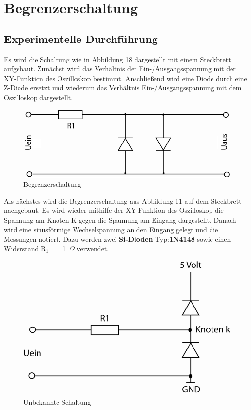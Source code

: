 \section{Begrenzerschaltung}
\subsection{Experimentelle Durchf\"uhrung}
Es wird die Schaltung wie in Abbildung 18 dargestellt mit einem Steckbrett aufgebaut. Zun\"achst wird das Verh\"altnis der Ein-/Ausgangsspannung mit der XY-Funktion des Oszilloskop bestimmt. Anschlie\ss end wird eine Diode durch eine Z-Diode ersetzt und wiederum das Verh\"altnis Ein-/Ausgangsspannung mit dem Oszilloskop dargestellt. 

\begin{figure}[ht]
\begin{center}
\includegraphics[scale=0.4]{schaltungVersuch4}
\caption{Begrenzerschaltung}
\end{center}
\end{figure} 
\noindent
Als n\"achstes wird die Begrenzerschaltung aus Abbildung 11 auf dem Steckbrett nachgebaut. Es wird wieder mithilfe der XY-Funktion des Oszilloskop die Spannung am Knoten K gegen die Spannung am Eingang dargestellt. Danach wird eine sinusf\"ormige Wechselspannung an den Eingang gelegt und die Messungen notiert. 
Dazu werden zwei \textbf{Si-Dioden} Typ:\textbf{1N4148} sowie einen Widerstand R$_1$ $=$ 1~$\Omega$ verwendet.
\begin{figure}[ht]
\begin{center}
\includegraphics[scale=0.4]{schaltungVersuch4Version2}
\caption{Unbekannte Schaltung}
\end{center}
\end{figure}
\newpage
